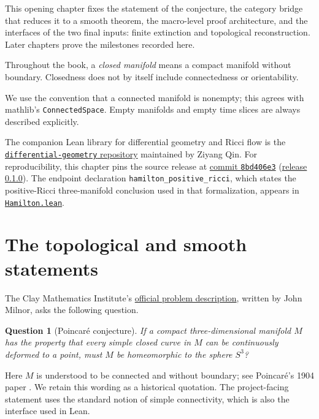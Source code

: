 \documentclass[10pt]{coll-l}
\newtheorem{question}[theorem]{Question}
\theoremstyle{definition}
\theoremstyle{remark}
\numberwithin{section}{chapter}
\numberwithin{equation}{chapter}
\begin{document}
This opening chapter fixes the statement of the conjecture, the category
bridge that reduces it to a smooth theorem, the macro-level proof
architecture, and the interfaces of the two final inputs: finite extinction
and topological reconstruction.  Later chapters prove the milestones
recorded here.

Throughout the book, a \emph{closed manifold} means a compact manifold
without boundary.  Closedness does not by itself include connectedness or
orientability.

We use the convention that a connected manifold is nonempty; this agrees
with mathlib's \texttt{ConnectedSpace}.  Empty manifolds and empty time
slices are always described explicitly.

The companion Lean library for differential geometry and Ricci flow is the
\href{https://github.com/qinz1yang/differential-geometry}
{\texttt{differential-geometry} repository} maintained by Ziyang Qin.  For
reproducibility, this
chapter pins the source release at
\href{https://github.com/qinz1yang/differential-geometry/commit/8bd406e35c33a200e9b88895cf11ee8429194e15}
{commit \texttt{8bd406e3}}
(\href{https://github.com/qinz1yang/differential-geometry/releases/tag/arxiv-v1-preview}
{release 0.1.0}).  The endpoint declaration
\texttt{hamilton\_positive\_ricci}, which states the positive-Ricci
three-manifold conclusion used in that formalization, appears in
\href{https://github.com/qinz1yang/differential-geometry/blob/8bd406e35c33a200e9b88895cf11ee8429194e15/DifferentialGeometry/Geometry/Flow/RicciFlow/DimensionThree/PositiveRicci/Hamilton.lean}
{\texttt{Hamilton.lean}}.

\section{The topological and smooth statements}

The Clay Mathematics Institute's
\href{https://www.claymath.org/wp-content/uploads/2022/06/poincare.pdf}
{official problem description}, written by John Milnor, asks the following
question.

\begin{question}[Poincar\'e conjecture]
If a compact three-dimensional manifold $M$ has the property that every
simple closed curve in $M$ can be continuously deformed to a point, must
$M$ be homeomorphic to the sphere $S^{3}$?
\end{question}

Here $M$ is understood to be connected and without boundary; see
Poincar\'e's 1904 paper \cite[pp.~370 and 498]{MR1401792}.  We retain this
wording as a historical quotation.  The project-facing statement uses the
standard notion of simple connectivity, which is also the interface used in
Lean.
\end{document}
